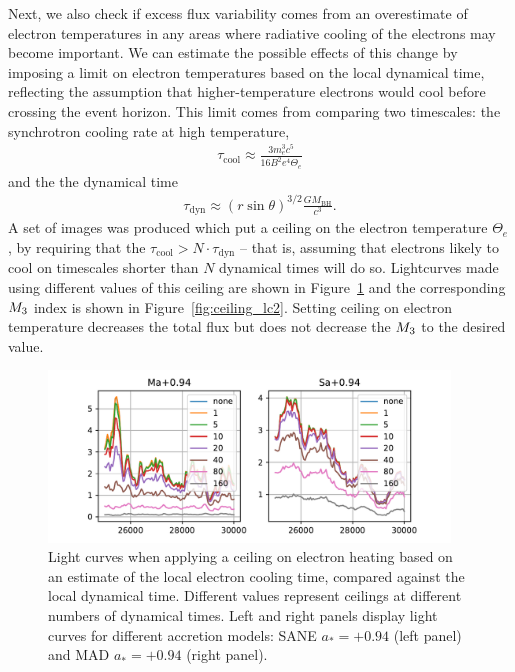 Next, we also check if excess flux variability comes from an overestimate of electron temperatures in any areas where radiative cooling of the electrons may become important. We can estimate the possible effects of this change by imposing a limit on electron temperatures based on the local dynamical time, reflecting the assumption that higher-temperature electrons would cool before crossing the event horizon.
This limit comes from comparing two timescales: the synchrotron cooling rate at high temperature,
\begin{align}
  \tau_\mathrm{cool} \approx \frac{3 m_e^3 c^5}{16 B^2 e^4 \Theta_e}
\end{align}
and the the dynamical time
\begin{align}
  \tau_\mathrm{dyn} \approx \left( r \sin{\theta} \right)^{3/2} \frac{G M_\mathrm{BH}}{c^3}.
\end{align}
A set of images was produced which put a ceiling on the electron temperature $\Theta_e$, by requiring that the $\tau_\mathrm{cool} > N \cdot \tau_\mathrm{dyn}$ -- that is, assuming that electrons likely to cool on timescales shorter than $N$ dynamical times will do so. Lightcurves made using different values of this ceiling are shown in Figure~\ref{fig:ceiling_lc1} and the corresponding $M_{3}$ index is shown in Figure~\ref{fig:ceiling_lc2}. Setting ceiling on electron temperature decreases the total flux but does not decrease the $M_{3}$ to the desired value.
\begin{figure}
  \centering
  \includegraphics[width=0.95\textwidth]{figures/ctcut_lightcurves.pdf}
  \caption{Light curves when applying a ceiling on electron heating based on an estimate of the local electron cooling time, compared against the local dynamical time. Different values represent ceilings at different numbers of dynamical times. Left and right panels display light curves for different accretion models: SANE $a_*=+0.94$ (left panel) and MAD $a_*=+0.94$ (right panel).}
  \label{fig:ceiling_lc1}
\end{figure}

